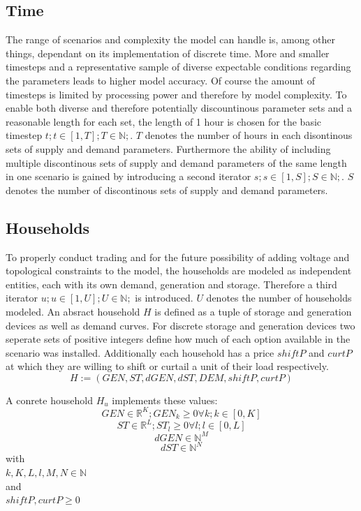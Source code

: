 \documentclass[
	11pt,								%
	DIV10,								%
	a4paper,         					%
	oneside,							%
	headheight=20pt,					%
	footheight=20pt,					%
    parskip=full,						%
    listof=totoc,						%
	bibliography=totoc,					%
	index=totoc,						%
]{scrartcl}
\begin{document}
\subsection{Time}
The range of scenarios and complexity the model can handle is, among other things, dependant on its implementation of discrete time. More and smaller timesteps and a representative sample of diverse expectable conditions regarding the parameters leads to higher model accuracy. Of course the amount of timesteps is limited by processing power and therefore by model complexity. To enable both diverse and therefore potentially discountinous parameter sets and a reasonable length for each set, the length of 1 hour is chosen for the basic timestep 
$t; t \in [1,T]; T \in \mathbb{N} ;$. $T$ denotes the number of hours in each disontinous sets of supply and demand parameters.
Furthermore the ability of including multiple discontinous sets of supply and demand parameters of the same length in one scenario is gained by introducing a second iterator 
$s; s \in [1,S]; S \in \mathbb{N} ;$. $S$ denotes the number of discontinous sets of supply and demand parameters.





\subsection{Households}
To properly conduct trading and for the future possibility of adding voltage and topological constraints to the model, the households are modeled as independent entities, each with its own demand, generation and storage. Therefore a third iterator $u; u \in [1,U]; U \in \mathbb{N};$ is introduced. $U$ denotes the number of households modeled.
An absract household $H$ is defined as a tuple of storage and generation devices as well as demand curves. For discrete storage and generation devices two seperate sets of positive integers define how much of each option available in the scenario was installed. Additionally each household has a price $shiftP$ and $curtP$ at which they are willing to shift or curtail a unit  of their load respectively.
\begin{equation}
	H := (GEN, ST, dGEN, dST, DEM, shiftP, curtP)
\end{equation}

A conrete household $H_u$ implements these values:
\begin{equation}
	GEN \in \mathbb{R}^{K}; GEN_k \geq 0 \forall k; k\in [0,K]
\end{equation}
\begin{equation}
	ST \in \mathbb{R}^{L}; ST_l \geq 0 \forall l; l\in [0,L] 
\end{equation}
\begin{equation}
	dGEN \in \mathbb{N}^{M}
\end{equation}
\begin{equation}
	dST \in \mathbb{N}^{N}
\end{equation}
with\\
$k,K,L,l,M,N \in \mathbb{N}$\\
and\\
$shiftP, curtP \geq 0$
\end{document}
